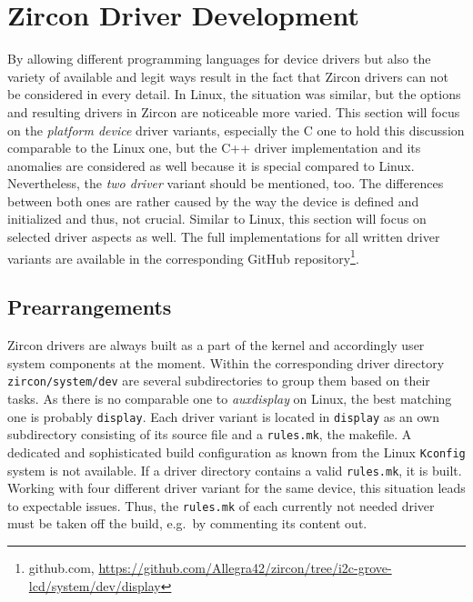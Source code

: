 
\section{Zircon Driver Development}\label{sec:cs-zircon}
By allowing different programming languages for device drivers but also the variety of available and legit ways result in the fact that Zircon drivers can not be considered in every detail.
In Linux, the situation was similar, but the options and resulting drivers in Zircon are noticeable more varied.
This section will focus on the \textit{platform device} driver variants, especially the C one to hold this discussion comparable to the Linux one, but the C++ driver implementation and its anomalies are considered as well because it is special compared to Linux.
Nevertheless, the \textit{two driver} variant should be mentioned, too.
The differences between both ones are rather caused by the way the device is defined and initialized and thus, not crucial.
Similar to Linux, this section will focus on selected driver aspects as well.
The full implementations for all written driver variants are available in the corresponding GitHub repository\footnote{github.com, \url{https://github.com/Allegra42/zircon/tree/i2c-grove-lcd/system/dev/display}}.

\subsection{Prearrangements}
Zircon drivers are always built as a part of the kernel and accordingly user system components at the moment.
Within the corresponding driver directory \texttt{zircon/system/dev} are several subdirectories to group them based on their tasks.
As there is no comparable one to \textit{auxdisplay} on Linux, the best matching one is probably \texttt{display}.
Each driver variant is located in \texttt{display} as an own subdirectory consisting of its source file and a \texttt{rules.mk}, the makefile.
A dedicated and sophisticated build configuration as known from the Linux \texttt{Kconfig} system is not available.
If a driver directory contains a valid \texttt{rules.mk}, it is built.
Working with four different driver variant for the same device, this situation leads to expectable issues.
Thus, the \texttt{rules.mk} of each currently not needed driver must be taken off the build, e.g.\ by commenting its content out.

